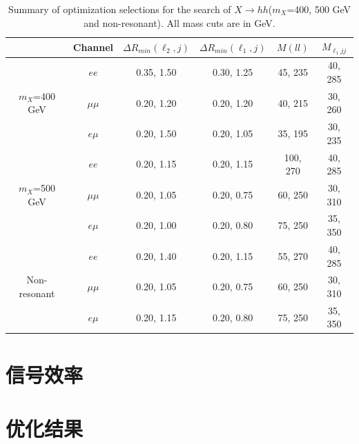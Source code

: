 \begin{table}[h]
\begin{center}
\begin{tabular}{c|c|c|c|c|c}
\hline
\hline
  &Channel &$\Delta R_{min}(\ell_{2}, j)$ &$\Delta R_{min}(\ell_{1}, j)$ &$M(ll)$  &$M_{\ell_{1}jj}$ \\
\hline
\multirow{3}{2.0cm}{$m_X$=400 GeV} &$ee$
&0.35, 1.50
&0.30, 1.25
&45, 235
&40, 285 \\
&$\mu\mu$
&0.20, 1.20
&0.20, 1.20
&40, 215
&30, 260 \\
&$e\mu$
&0.20, 1.50
&0.20, 1.05
&35, 195
&30, 235 \\
\hline
\multirow{3}{2.0cm}{$m_X$=500 GeV} &$ee$
&0.20, 1.15
&0.20, 1.15
&100, 270
&40, 285 \\
&$\mu\mu$
&0.20, 1.05
&0.20, 0.75
&60, 250
&30, 310 \\
&$e\mu$
&0.20, 1.00
&0.20, 0.80
&75, 250
&35, 350 \\
\hline
\multirow{3}{2.0cm}{Non-resonant} & $ee$
&0.20, 1.40
&0.20, 1.15
&55, 270
&40, 285 \\
&$\mu\mu$
&0.20, 1.05
&0.20, 0.75
&60, 250
&30, 310 \\
&$e\mu$
&0.20, 1.15
&0.20, 0.80
&75, 250
&35, 350 \\
\hline
\hline
\end{tabular}
\end{center}
\caption{Summary of optimization selections for the search of $X \rightarrow hh$($m_{X}$=400, 500 GeV and non-resonant). All mass cuts are in GeV.}
\label{optimization_cuts_highmass}
\end{table}
 
\section{信号效率}


\section{优化结果}

